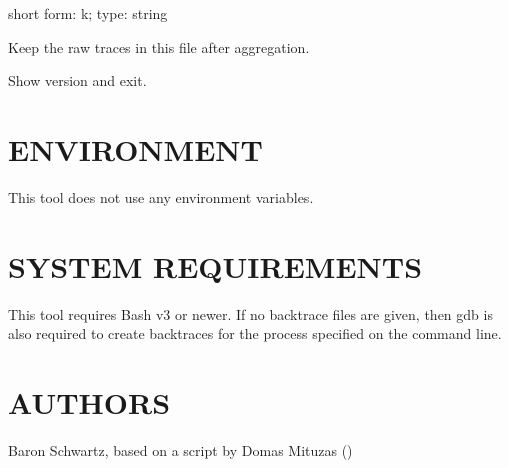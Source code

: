 \documentclass[letterpaper,10pt,english]{sphinxmanual}
\begin{document}
\begin{fulllineitems}
\label{\detokenize{mariadb-stacktrace:cmdoption-mariadb-stacktrace-save-samples}}
\sphinxAtStartPar
short form: \sphinxhyphen{}k; type: string

\sphinxAtStartPar
Keep the raw traces in this file after aggregation.

\end{fulllineitems}


\begin{fulllineitems}
\label{\detokenize{mariadb-stacktrace:cmdoption-mariadb-stacktrace-version}}
\sphinxAtStartPar
Show version and exit.

\end{fulllineitems}



\section{ENVIRONMENT}
\label{\detokenize{mariadb-stacktrace:environment}}
\sphinxAtStartPar
This tool does not use any environment variables.


\section{SYSTEM REQUIREMENTS}
\label{\detokenize{mariadb-stacktrace:system-requirements}}
\sphinxAtStartPar
This tool requires Bash v3 or newer.  If no backtrace files are given,
then gdb is also required to create backtraces for the process specified
on the command line.


\section{AUTHORS}
\label{\detokenize{mariadb-stacktrace:authors}}
\sphinxAtStartPar
Baron Schwartz, based on a script by Domas Mituzas ()
\end{document}
